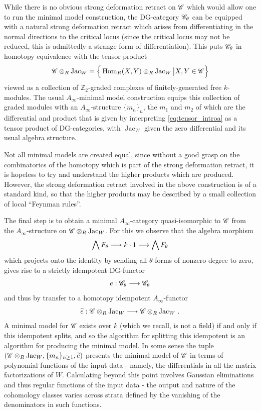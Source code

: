 \documentclass[english,letter paper,12pt,leqno]{article}
\theoremstyle{example}
\numberwithin{equation}{section}
\def\Hom{\operatorname{Hom}}
\def\be{\begin{equation}}
\def\ee{\end{equation}}
\def\nZ{\mathds{Z}}
\def\jac{\operatorname{Jac}_W}
\begin{document}
While there is no obvious strong deformation retract on $\mathscr{C}$ which would allow one to run the minimal model construction, the DG-category $\mathscr{C}_\theta$ can be equipped with a natural strong deformation retract which arises from differentiating in the normal directions to the critical locus (since the critical locus may not be reduced, this is admittedly a strange form of differentiation). This puts $\mathscr{C}_\theta$ in homotopy equivalence with the tensor product
\be\label{eq:tensor_introa}
\md{C} \otimes_R \jac = \Big\{ \Hom_R(X,Y) \otimes_R \jac \big| X,Y \in \mathscr{C} \Big\}
\ee
viewed as a collection of $\nZ_2$-graded complexes of finitely-generated free $k$-modules. The usual $A_\infty$-minimal model construction equips this collection of graded modules with an $A_\infty$-structure $\{m_n\}_n$, the $m_1$ and $m_2$ of which are the differential and product that is given by interpreting \eqref{eq:tensor_introa} as a tensor product of DG-categories, with $\jac$ given the zero differential and its usual algebra structure.

Not all minimal models are created equal, since without a good grasp on the combinatorics of the homotopy which is part of the strong deformation retract, it is hopeless to try and understand the higher products which are produced. However, the strong deformation retract involved in the above construction is of a standard kind, so that the higher products may be described by a small collection of local ``Feynman rules''. 

The final step is to obtain a minimal $A_\infty$-category quasi-isomorphic to $\mathscr{C}$ from the $A_\infty$-structure on $\md{C} \otimes_R \jac$. For this we observe that the algebra morphism 
\[
\bigwedge F_\theta \longrightarrow k \cdot 1 \longrightarrow \bigwedge F_\theta
\]
which projects onto the identity by sending all $\theta$-forms of nonzero degree to zero, gives rise to a strictly idempotent DG-functor
\[
e: \mathscr{C}_\theta \longrightarrow \mathscr{C}_\theta
\]
and thus by transfer to a homotopy idempotent $A_\infty$-functor
\[
\widetilde{e}: \md{C} \otimes_R \jac \lto \md{C} \otimes_R \jac\,.
\]
A minimal model for $\mathscr{C}$ exists over $k$ (which we recall, is not a field) if and only if this idempotent splits, and so the algorithm for splitting this idempotent is an algorithm for producing the minimal model. In some sense the tuple $(\md{C} \otimes_R \jac, \{m_n\}_{n \ge 1}, \widetilde{e})$ presents the minimal model of $\mathscr{C}$ in terms of polynomial functions of the input data - namely, the differentials in all the matrix factorizations of $W$. Calculating beyond this point involves Gaussian eliminations and thus regular functions of the input data - the output and nature of the cohomology classes varies across strata defined by the vanishing of the denominators in such functions. 
\end{document}
